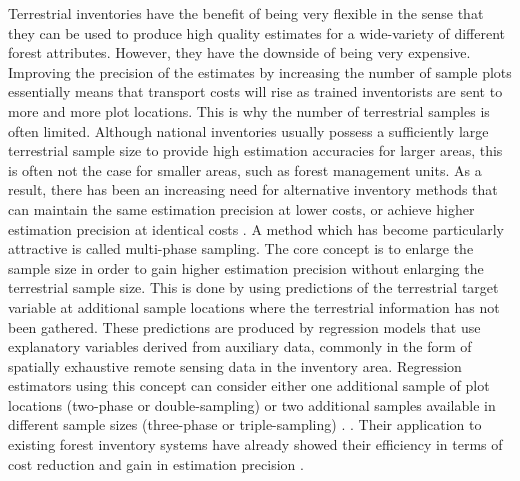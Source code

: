Terrestrial inventories have the benefit of being very flexible in the sense that they can be used to produce high quality estimates for a wide-variety of different forest attributes. However, they have the downside of being very expensive.  Improving the precision of the estimates by increasing the number of sample plots essentially means that transport costs will rise as trained inventorists are sent to more and more plot locations. This is why the number of terrestrial samples is often limited. Although national inventories usually possess a sufficiently large terrestrial sample size to provide high estimation accuracies for larger areas, this is often not the case for smaller areas, such as forest management units.  As a result, there has been an increasing need for alternative inventory methods that can maintain the same estimation precision at lower costs, or achieve higher estimation precision at identical costs \citep{vonluepke2013}. A method which has become particularly attractive is called multi-phase sampling. The core concept is to enlarge the sample size in order to gain higher estimation precision without enlarging the terrestrial sample size. This is done by using predictions of the terrestrial target variable at additional sample locations where the terrestrial information has not been gathered. These predictions are produced by regression models that use explanatory variables derived from auxiliary data, commonly in the form of spatially exhaustive remote sensing data in the inventory area. Regression estimators using this concept can consider either one additional sample of plot locations (two-phase or double-sampling) or two additional samples available in different sample sizes (three-phase or triple-sampling) \citep{gregoire2007, saborowski2010,  mandallaz2013a, mandallaz2013c, vonLuepke2012}. \citep{gregoire2007, saborowski2010, mandallaz2013a, mandallaz2013c, vonLuepke2012}. Their application to existing forest inventory systems have already showed their efficiency in terms of cost reduction and gain in estimation precision \citep{breidenbach2012, vonLuebke2014, mandallaz2013b, magnussen2014, massey2014a}.\par

